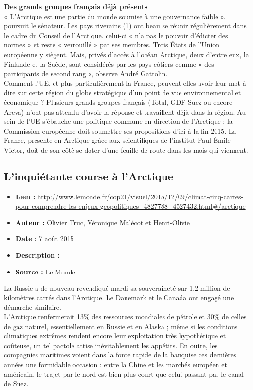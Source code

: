 \documentclass[8pt]{article}
\begin{document}
\textbf{Des grands groupes français déjà présents}\\

« L’Arctique est une partie du monde soumise à une gouvernance faible », poursuit le sénateur. Les pays riverains (1) ont beau se réunir régulièrement dans le cadre du Conseil de l’Arctique, celui-ci « n’a pas le pouvoir d’édicter des normes » et reste « verrouillé » par ses membres. Trois États de l’Union européenne y siègent. Mais, privés d’accès à l’océan Arctique, deux d’entre eux, la Finlande et la Suède, sont considérés par les pays côtiers comme « des participants de second rang », observe André Gattolin.\\

Comment l’UE, et plus particulièrement la France, peuvent-elles avoir leur mot à dire sur cette région du globe stratégique d’un point de vue environnemental et économique ? Plusieurs grands groupes français (Total, GDF-Suez ou encore Areva) n’ont pas attendu d’avoir la réponse et travaillent déjà dans la région. Au sein de l’UE s’ébauche une politique commune en direction de l’Arctique : la Commission européenne doit soumettre ses propositions d’ici à la fin 2015. La France, présente en Arctique grâce aux scientifiques de l’institut Paul-Émile-Victor, doit de son côté se doter d’une feuille de route dans les mois qui viennent.

\subsection{L’inquiétante course à l’Arctique}
\begin{itemize}
	\item \textbf{Lien : }  \url{http://www.lemonde.fr/cop21/visuel/2015/12/09/climat-cinq-cartes-pour-comprendre-les-enjeux-geopolitiques_4827788_4527432.html#/arctique} 
	\item \textbf{Auteur : }  Olivier Truc, Véronique Malécot et Henri-Olivie
	\item \textbf{Date : } 7 août 2015
	\item \textbf{Description : }
	\item \textbf{Source : } Le Monde
\end{itemize}

La Russie a de nouveau revendiqué mardi sa souveraineté sur 1,2 million de kilomètres carrés dans l’Arctique. Le Danemark et le Canada ont engagé une démarche similaire.\\

L’Arctique renfermerait 13\% des ressources mondiales de pétrole et 30\% de celles de gaz naturel, essentiellement en Russie et en Alaska ; même si les conditions climatiques extrêmes rendent encore leur exploitation très hypothétique et coûteuse, un tel pactole attise inévitablement les appétits. En outre, les compagnies maritimes voient dans la fonte rapide de la banquise ces dernières années une formidable occasion : entre la Chine et les marchés européen et américain, le trajet par le nord est bien plus court que celui passant par le canal de Suez.\\
\end{document}
